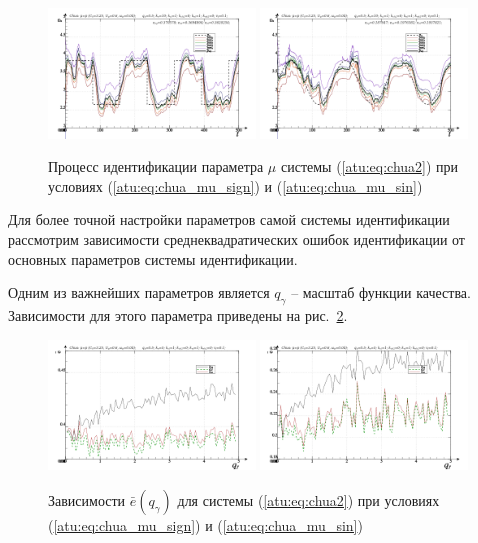 \documentclass[a4paper,12pt]{article}
\begin{document}
\begin{figure}[htb!]
\centerline{
  \includegraphics[width=0.49\textwidth]{p/cha/chua/chua_m5p-pl_n_sign.png}
  \includegraphics[width=0.49\textwidth]{p/cha/chua/chua_m5p-pl_n_sin.png}
}
\caption{Процесс идентификации параметра $\mu$ системы (\ref{atu:eq:chua2})
  при условиях (\ref{atu:eq:chua_mu_sign}) и (\ref{atu:eq:chua_mu_sin})
}
\label{atu:f:chua_id}
\end{figure}

Для более точной настройки параметров самой системы идентификации
рассмотрим зависимости среднеквадратических ошибок идентификации
от основных параметров системы идентификации.

Одним из важнейших параметров является $q_\gamma$ -- масштаб функции качества.
Зависимости для этого параметра приведены на рис.~\ref{atu:f:chua_e_qgamma}.

\begin{figure}[htb!]
\centerline{
  \includegraphics[width=0.49\textwidth]{p/cha/chua/chua_m5p-p_qg_e_sign.png}
  \includegraphics[width=0.49\textwidth]{p/cha/chua/chua_m5p-p_qg_e_sin.png}
}
  \caption{Зависимости  $\bar{e}(q_\gamma)$ для системы (\ref{atu:eq:chua2})
  при условиях (\ref{atu:eq:chua_mu_sign}) и (\ref{atu:eq:chua_mu_sin})
}
\label{atu:f:chua_e_qgamma}
\end{figure}
\end{document}
